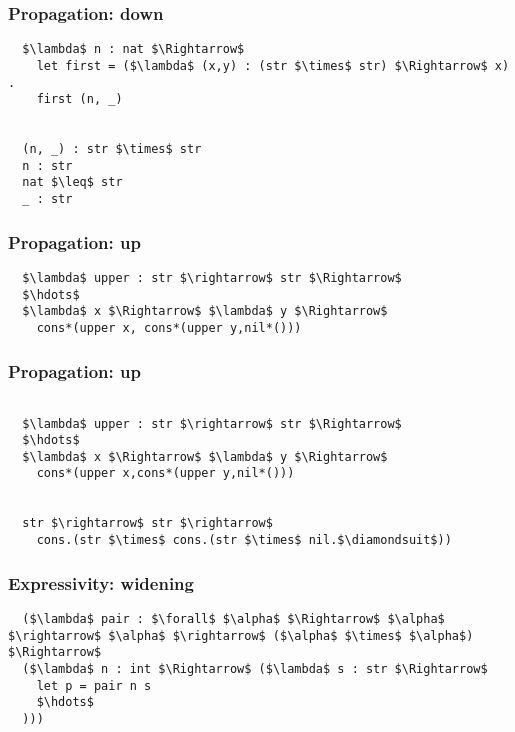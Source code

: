 \documentclass{beamer}
\begin{document}
\begin{frame}[fragile]
  \frametitle{Propagation: down}

  \begin{lstlisting}
  $\lambda$ n : nat $\Rightarrow$
    let first = ($\lambda$ (x,y) : (str $\times$ str) $\Rightarrow$ x) .
    first (n, _) 

    
  (n, _) : str $\times$ str
  n : str   
  nat $\leq$ str 
  _ : str  
  \end{lstlisting}

\end{frame}

\begin{frame}[fragile]
  \frametitle{Propagation: up}

  \begin{lstlisting}
  $\lambda$ upper : str $\rightarrow$ str $\Rightarrow$
  $\hdots$
  $\lambda$ x $\Rightarrow$ $\lambda$ y $\Rightarrow$
    cons*(upper x, cons*(upper y,nil*()))
  \end{lstlisting}

\end{frame}

\begin{frame}[fragile]
  \frametitle{Propagation: up}

  \begin{lstlisting}

  $\lambda$ upper : str $\rightarrow$ str $\Rightarrow$
  $\hdots$
  $\lambda$ x $\Rightarrow$ $\lambda$ y $\Rightarrow$
    cons*(upper x,cons*(upper y,nil*()))


  str $\rightarrow$ str $\rightarrow$
    cons.(str $\times$ cons.(str $\times$ nil.$\diamondsuit$))
  \end{lstlisting}

\end{frame}

\begin{frame}[fragile]
  \frametitle{Expressivity: widening}

  \begin{lstlisting}
  ($\lambda$ pair : $\forall$ $\alpha$ $\Rightarrow$ $\alpha$ $\rightarrow$ $\alpha$ $\rightarrow$ ($\alpha$ $\times$ $\alpha$) $\Rightarrow$ 
  ($\lambda$ n : int $\Rightarrow$ ($\lambda$ s : str $\Rightarrow$ 
    let p = pair n s
    $\hdots$
  )))

  \end{lstlisting}
\end{frame}
\end{document}
